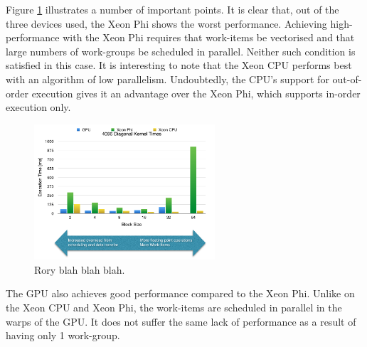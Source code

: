 \par{Figure \ref{DiagonalKernel} illustrates a number of important points. It is clear that, 
    out of the three devices used, the Xeon Phi shows the worst performance. 
    Achieving high-performance with the Xeon Phi requires that work-items be vectorised and 
    that large numbers of work-groups be scheduled in parallel. Neither such condition is satisfied in this case. 
    It is interesting to note that the Xeon CPU performs best with an algorithm of low parallelism. 
    Undoubtedly, the CPU’s support for out-of-order execution gives it an advantage over the Xeon Phi, 
    which supports in-order execution only.}

\begin{figure}[!h]
    \centering
    \includegraphics[width=0.6\textwidth]{figures/DiagonalKernel.png}
    \caption{Rory blah blah blah.}
    \label{DiagonalKernel}
\end{figure}

\par{The GPU also achieves good performance compared to the Xeon Phi. Unlike on the Xeon CPU and Xeon Phi, 
    the work-items are scheduled in parallel in the warps of the GPU. It does not suffer the same lack of 
    performance as a result of having only 1 work-group.}



